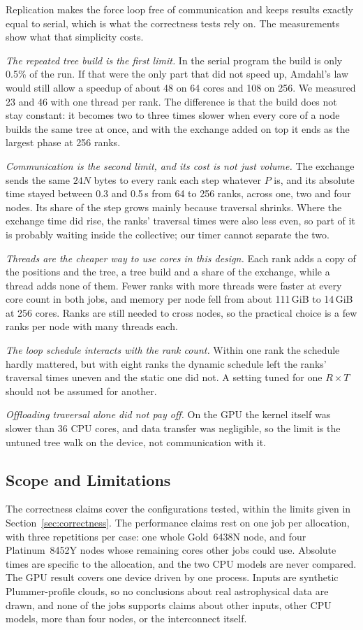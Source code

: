 \documentclass[10pt,a4paper,twocolumn,twoside]{rho-class/rho}
\begin{document}
Replication makes the force loop free of communication and keeps results exactly equal to serial, which is what the correctness tests rely on. The measurements show what that simplicity costs.

\emph{The repeated tree build is the first limit.} In the serial program the build is only 0.5\% of the run. If that were the only part that did not speed up, Amdahl's law~\cite{Lecture7} would still allow a speedup of about 48 on 64 cores and 108 on 256. We measured 23 and 46 with one thread per rank. The difference is that the build does not stay constant: it becomes two to three times slower when every core of a node builds the same tree at once, and with the exchange added on top it ends as the largest phase at 256 ranks.

\emph{Communication is the second limit, and its cost is not just volume.} The exchange sends the same $24N$ bytes to every rank each step whatever $P$ is, and its absolute time stayed between 0.3 and 0.5\,s from 64 to 256 ranks, across one, two and four nodes. Its share of the step grows mainly because traversal shrinks. Where the exchange time did rise, the ranks' traversal times were also less even, so part of it is probably waiting inside the collective; our timer cannot separate the two.

\emph{Threads are the cheaper way to use cores in this design.} Each rank adds a copy of the positions and the tree, a tree build and a share of the exchange, while a thread adds none of them. Fewer ranks with more threads were faster at every core count in both jobs, and memory per node fell from about 111\,GiB to 14\,GiB at 256 cores. Ranks are still needed to cross nodes, so the practical choice is a few ranks per node with many threads each.

\emph{The loop schedule interacts with the rank count.} Within one rank the schedule hardly mattered, but with eight ranks the dynamic schedule left the ranks' traversal times uneven and the static one did not. A setting tuned for one $R\times T$ should not be assumed for another.

\emph{Offloading traversal alone did not pay off.} On the GPU the kernel itself was slower than 36 CPU cores, and data transfer was negligible, so the limit is the untuned tree walk on the device, not communication with it.

\subsection{Scope and Limitations}
\label{sec:limitations}
The correctness claims cover the configurations tested, within the limits given in Section~\ref{sec:correctness}. The performance claims rest on one job per allocation, with three repetitions per case: one whole Gold~6438N node, and four Platinum~8452Y nodes whose remaining cores other jobs could use. Absolute times are specific to the allocation, and the two CPU models are never compared. The GPU result covers one device driven by one process. Inputs are synthetic Plummer-profile clouds, so no conclusions about real astrophysical data are drawn, and none of the jobs supports claims about other inputs, other CPU models, more than four nodes, or the interconnect itself.
\end{document}
